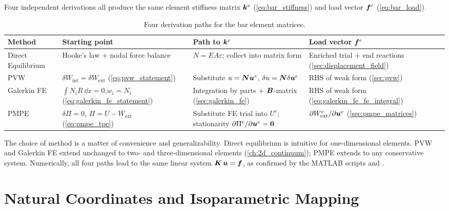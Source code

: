 Four independent derivations all produce the same element stiffness matrix
$\bm{k}^e$ (\cref{eq:bar_stiffness}) and load vector $\bm{f}^e$
(\cref{eq:bar_load}).

\begin{table}[htbp]
\centering
\small
\caption{Four derivation paths for the bar element matrices.}
\label{tab:four_methods}
\begin{tabular}{@{}lp{2.8cm}p{3.8cm}p{3.6cm}@{}}
\toprule
\textbf{Method}
  & \textbf{Starting point}
  & \textbf{Path to $\bm{k}^e$}
  & \textbf{Load vector $\bm{f}^e$} \\
\midrule
Direct Equilibrium
  & Hooke's law $+$ nodal force balance
  & $N = EA\varepsilon$; collect into matrix form
  & Enriched trial $+$ end reactions (\cref{sec:displacement_field}) \\[6pt]
PVW
  & $\delta W_{\mathrm{int}} = \delta W_{\mathrm{ext}}$ (\cref{eq:pvw_statement})
  & Substitute $u = \bm{N}\bm{u}^e$, $\delta u = \bm{N}\delta\bm{u}^e$
  & RHS of weak form (\cref{sec:pvw}) \\[6pt]
Galerkin FE
  & $\int N_i R\,\dd x = 0$,\newline $w_i = N_i$ (\cref{eq:galerkin_fe_statement})
  & Integration by parts $+$ $\bm{B}$-matrix (\cref{sec:galerkin_fe})
  & RHS of weak form (\cref{eq:galerkin_fe_fe_integral}) \\[6pt]
PMPE
  & $\delta\Pi = 0$, $\Pi = U - W_{\mathrm{ext}}$ (\cref{eq:pmpe_tpe})
  & Substitute FE trial into $U^e$; stationarity $\partial\Pi^e/\partial\bm{u}^e = \bm{0}$
  & $\partial W_{\mathrm{ext}}^e/\partial\bm{u}^e$ (\cref{sec:pmpe_matrices}) \\
\bottomrule
\end{tabular}
\end{table}

The choice of method is a matter of convenience and generalizability. Direct
equilibrium is intuitive for one-dimensional elements. PVW and Galerkin FE
extend unchanged to two- and three-dimensional elements
(\cref{ch:2d_continuum}); PMPE extends to any conservative system. Numerically,
all four paths lead to the same linear system $\bm{K}\,\bm{u} = \bm{f}$,
as confirmed by the MATLAB scripts  and
.

\section{Natural Coordinates and Isoparametric Mapping}
\label{sec:isoparametric_1d}

